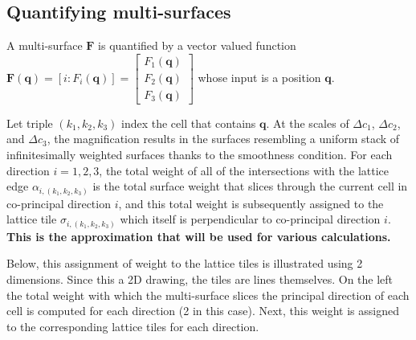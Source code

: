 \documentclass{book}
\begin{document}
%
%




\subsection*{Quantifying multi-surfaces}

A multi-surface \(\mathbf{F}\) is quantified by a vector valued function \(\mathbf{F}(\mathbf{q}) = [i : F_i(\mathbf{q})] = \begin{bmatrix} F_1(\mathbf{q}) \\ F_2(\mathbf{q}) \\ F_3(\mathbf{q}) \end{bmatrix}\) whose input is a position \(\mathbf{q}\). 

Let triple \((k_1, k_2, k_3)\) index the cell that contains \(\mathbf{q}\). At the scales of \(\Delta c_1\), \(\Delta c_2\), and \(\Delta c_3\), the magnification results in the surfaces resembling a uniform stack of infinitesimally weighted surfaces thanks to the smoothness condition. For each direction \(i = 1, 2, 3\), the total weight of all of the intersections with the lattice edge \(\alpha_{i, (k_1, k_2, k_3)}\) is the total surface weight that slices through the current cell in co-principal direction \(i\), and this total weight is subsequently assigned to the lattice tile \(\sigma_{i, (k_1, k_2, k_3)}\) which itself is perpendicular to co-principal direction \(i\). {\bf This is the approximation that will be used for various calculations.} 

Below, this assignment of weight to the lattice tiles is illustrated using 2 dimensions. Since this a 2D drawing, the tiles are lines themselves. On the left the total weight with which the multi-surface slices the principal direction of each cell is computed for each direction (2 in this case). Next, this weight is assigned to the corresponding lattice tiles for each direction.
\end{document}
